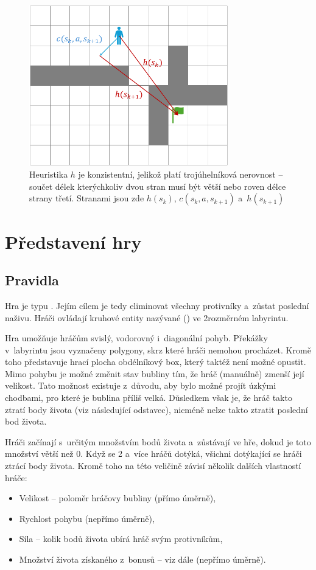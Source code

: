 \begin{figure}
    \centering
    \includegraphics[height=7cm]{doc/obrazky-figures/astar-heuristic-consistency.png}
    \caption{Heuristika $h$ je konzistentní, jelikož platí trojúhelníková nerovnost -- součet délek kterýchkoliv dvou stran musí být větší nebo roven délce strany třetí. Stranami jsou zde ${h(s_k)}$, ${c(s_k, a, s_{k+1})}$ a~${h(s_{k+1})}$}
    \label{fig:astar-heuristic-consistency}
\end{figure}


\chapter{Představení hry}

\section{Pravidla}
Hra je typu . Jejím cílem je tedy eliminovat všechny protivníky a~zůstat poslední naživu. Hráči ovládají kruhové entity nazývané  () ve 2rozměrném labyrintu. 

Hra umožňuje hráčům svislý, vodorovný i~diagonální pohyb. Překážky v~labyrintu jsou vyznačeny polygony, skrz které hráči nemohou procházet. Kromě toho představuje hrací plocha obdélníkový box, který taktéž není možné opustit. Mimo pohybu je možné změnit stav bubliny tím, že hráč (manuálně) zmenší její velikost. Tato možnost existuje z~důvodu, aby bylo možné projít úzkými chodbami, pro které je bublina příliš velká. Důsledkem však je, že hráč takto ztratí body života (viz následující odstavec), nicméně nelze takto ztratit poslední bod života.

Hráči začínají s~určitým množstvím bodů života a~zůstávají ve hře, dokud je toto množství větší než 0. Když se 2 a~více hráčů dotýká, všichni dotýkající se hráči ztrácí body života. Kromě toho na této veličině závisí několik dalších vlastností hráče:
\begin{itemize}
    \item Velikost -- poloměr hráčovy bubliny (přímo úměrně),
    \item Rychlost pohybu (nepřímo úměrně),
    \item Síla -- kolik bodů života ubírá hráč svým protivníkům,
    \item Množství života získaného z~bonusů -- viz dále (nepřímo úměrně).
\end{itemize}

